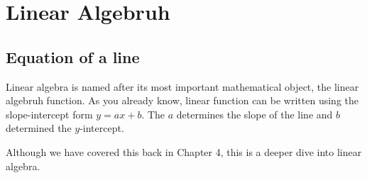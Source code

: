 \documentclass[a4paper]{article}
\theoremstyle{plain}
\theoremstyle{definition}
\theoremstyle{remark}
\newcommand{\sectionSpace}{\vspace{2em}} %
\begin{document}
\sectionSpace
\section{Linear Algebruh}
    \subsection{Equation of a line}
    Linear algebra is named after its most important mathematical object, the linear algebruh function. As you already know, linear function can be written using the slope-intercept form $y=ax+b$. The $a$ determines the slope of the line and $b$ determined the $y$-intercept.

    Although we have covered this back in Chapter 4, this is a deeper dive into linear algebra.
\end{document}
